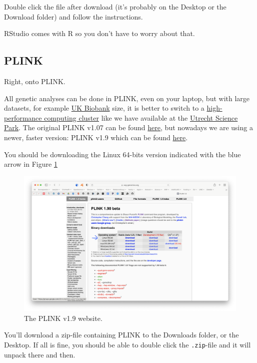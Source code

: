 \documentclass[
]{book}
\newcommand{\passthrough}[1]{#1}
\begin{document}
Double click the file after download (it's probably on the Desktop or the Download folder) and follow the instructions.

RStudio comes with R so you don't have to worry about that.

\hypertarget{plink}{%
\subsection{PLINK}\label{plink}}

Right, onto PLINK.

All genetic analyses can be done in PLINK, even on your laptop, but with large datasets, for example \href{https://www.ukbiobank.ac.uk}{UK Biobank} size, it is better to switch to a \href{https://en.wikipedia.org/wiki/High-performance_computing}{high-performance computing cluster} like we have available at the \href{https://wiki.bioinformatics.umcutrecht.nl/bin/view/HPC/WebHome}{Utrecht Science Park}. The original PLINK v1.07 can be found \href{https://zzz.bwh.harvard.edu/plink/index.shtml}{here}, but nowadays we are using a newer, faster version: PLINK v1.9 which can be found \href{https://www.cog-genomics.org/plink2}{here}.

You should be downloading the Linux 64-bits version indicated with the blue arrow in Figure \ref{fig:plink}

\begin{figure}

{\centering \includegraphics[width=43.11in]{img/plink} 

}

\caption{The PLINK v1.9 website.}\label{fig:plink}
\end{figure}

You'll download a zip-file containing PLINK to the Downloads folder, or the Desktop. If all is fine, you should be able to double click the \passthrough{\lstinline!.zip!}-file and it will unpack there and then.
\end{document}
